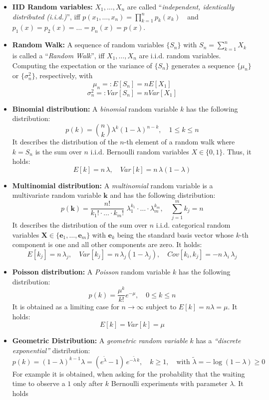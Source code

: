 \begin{itemize}
\begin{itemize}
\end{itemize} 
\item {\bf IID Random variables:} $X_1, \dots, X_n$ are called ``{\it independent, identically distributed (i.i.d.)}'', iff $p(x_1, \dots, x_n)=\prod_{k=1}^n p_k(x_k)$  \,\, and \,\, $p_1(x)=p_2(x)=\dots = p_n(x)= p(x)$.
\item {\bf Random Walk:} A sequence of random variables $\{S_n\}$ with $S_n=\sum_{k=1}^n X_k$ is called a ``{\it Random Walk}'', iff $X_1, \dots, X_n$ are 
i.i.d. random variables. Computing the expectation or the variance of $\{S_n\}$ generates a sequence $\{\mu_n\}$ or $\{\sigma^2_n\}$, respectively, with
$$
\mu_n=:E[S_n]=nE[X_1]
$$ 
$$
\sigma^2_n=:Var[S_n]=nVar[X_1]
$$ 
\item {\bf Binomial distribution:} A {\it binomial} random variable $k$ has the following distribution:
$$
p(k) = {n \choose k} \lambda^k (1-\lambda)^{n-k}, \quad 1\le k \le n 
$$
It describes the distribution of the $n$-th element of a random walk where $k=S_n$ is the sum over $n$ i.i.d. Bernoulli random variables $X \in \{0,1\}$. Thus, it holds:
$$
E[k] = n\, \lambda, \quad Var[k]= n \, \lambda (1-\lambda)
$$
\item {\bf Multinomial distribution:} A {\it multinomial} random variable is a multivariate random variable $\mathbf{k}$ and has the following distribution:
$$
p(\mathbf{k}) = \frac{n!}{k_1! \cdot \dots \cdot k_m!} \,\, \lambda_1^{k_1} \cdot \dots \cdot \lambda_m^{k_m}, \quad \sum_{j=1}^m k_j = n 
$$
It describes the distribution of the sum over $n$ i.i.d. categorical random variables $\mathbf{X} \in \{\mathbf{e}_1, \dots, \mathbf{e}_m\}$ with $\mathbf{e}_k$ being the standard basis vector whose $k$-th component is one and all other components are zero. It holds:
$$
E[k_j] = n\, \lambda_j, \quad Var[k_j]= n \, \lambda_j (1-\lambda_j), \quad Cov[k_i, k_j]= -n \, \lambda_i \,\lambda_j 
$$
\item {\bf Poisson distribution:} A {\it Poisson} random variable $k$ has the following distribution:
$$
p(k) = \frac{\mu^k}{k!} e^{-\mu}, \quad 0\le k \le n
$$
It is obtained as a limiting case for $n \to \infty$ subject to $E[k]=n\lambda=\mu$. It holds:
$$
E[k] = Var[k]= \mu
$$
\item {\bf Geometric Distribution:} A {\it geometric random variable} $k$ has a {\it ``discrete exponential''} distribution:
$$
p(k) = (1-\lambda)^{k-1} \lambda = (e^{\tilde \lambda}-1) \, e^{-\tilde \lambda \, k}, \quad  k \ge 1, \quad \mbox{with } \tilde \lambda = -\log(1-\lambda) \ge 0
$$
For example it is obtained, when asking for the probability that the waiting time to observe a $1$ only after $k$ Bernoulli experiments with parameter $\lambda$. It holds

\end{itemize}
